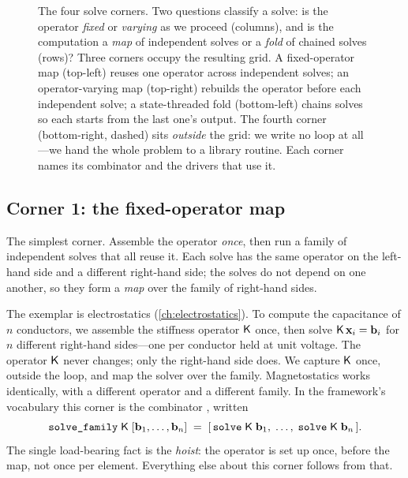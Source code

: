 \begin{figure}[p]
\caption[The four solve corners]{The four solve corners. Two questions
classify a solve: is the operator \emph{fixed} or \emph{varying} as we proceed
(columns), and is the computation a \emph{map} of independent solves or a
\emph{fold} of chained solves (rows)? Three corners occupy the resulting grid.
A fixed-operator map (top-left) reuses one operator across independent solves; an
operator-varying map (top-right) rebuilds the operator before each independent
solve; a state-threaded fold (bottom-left) chains solves so each starts from the
last one's output. The fourth corner (bottom-right, dashed) sits \emph{outside}
the grid: we write no loop at all---we hand the whole problem to a library
routine. Each corner names its combinator and the drivers that use it.}
\label{fig:corners}
\end{figure}

\subsection{Corner 1: the fixed-operator map}

The simplest corner. Assemble the operator \emph{once}, then run a family of
independent solves that all reuse it. Each solve has the same operator on the
left-hand side and a different right-hand side; the solves do not depend on one
another, so they form a \emph{map} over the family of right-hand sides.

The exemplar is electrostatics (\cref{ch:electrostatics}). To compute the
capacitance of $n$ conductors, we assemble the stiffness operator $\mathsf{K}$ once,
then solve $\mathsf{K}\,\mathbf{x}_i = \mathbf{b}_i$ for $n$ different right-hand sides---one per
conductor held at unit voltage. The operator $\mathsf{K}$ never changes; only the
right-hand side does. We capture $\mathsf{K}$ once, outside the loop, and map the
solver over the family. Magnetostatics works identically, with a different
operator and a different family. In the framework's vocabulary this corner is
the combinator , written
\[
  \texttt{solve\_family}\;\mathsf{K}\;[\mathbf{b}_1,\dots,\mathbf{b}_n]
    \;=\; [\,\texttt{solve}\;\mathsf{K}\;\mathbf{b}_1,\;\dots,\;\texttt{solve}\;\mathsf{K}\;\mathbf{b}_n\,].
\]
The single load-bearing fact is the \emph{hoist}: the operator is set up once,
before the map, not once per element. Everything else about this corner follows
from that.

